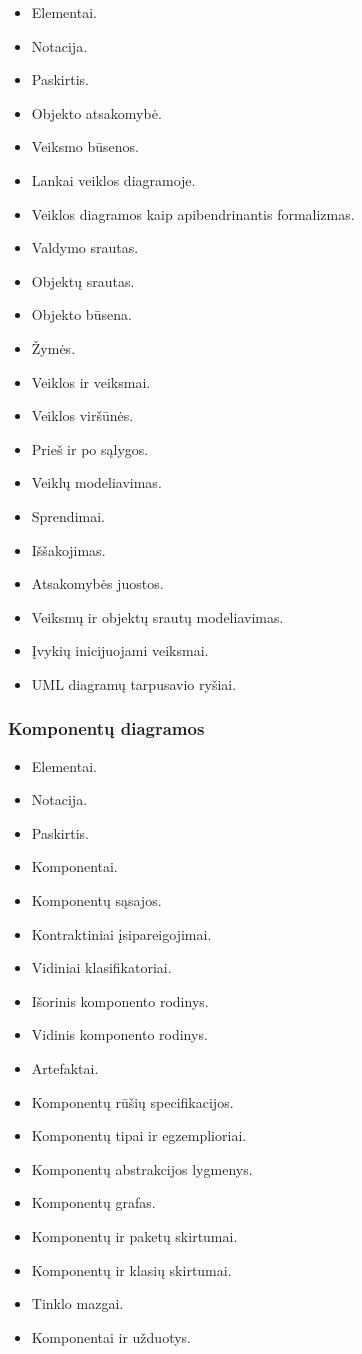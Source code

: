 \begin{itemize}
  \item Elementai.
  \item Notacija.
  \item Paskirtis.
  \item Objekto atsakomybė.
  \item Veiksmo būsenos.
  \item Lankai veiklos diagramoje.
  \item Veiklos diagramos kaip apibendrinantis formalizmas.
  \item Valdymo srautas.
  \item Objektų srautas.
  \item Objekto būsena.
  \item Žymės.
  \item Veiklos ir veiksmai.
  \item Veiklos viršūnės.
  \item Prieš ir po sąlygos.
  \item Veiklų modeliavimas.
  \item Sprendimai.
  \item Iššakojimas.
  \item Atsakomybės juostos.
  \item Veiksmų ir objektų srautų modeliavimas.
  \item Įvykių inicijuojami veiksmai.
  \item UML diagramų tarpusavio ryšiai.
\end{itemize}

\subsubsection{Komponentų diagramos}

\begin{itemize}
  \item Elementai.
  \item Notacija.
  \item Paskirtis.
  \item Komponentai.
  \item Komponentų sąsajos.
  \item Kontraktiniai įsipareigojimai.
  \item Vidiniai klasifikatoriai.
  \item Išorinis komponento rodinys.
  \item Vidinis komponento rodinys.
  \item Artefaktai.
  \item Komponentų rūšių specifikacijos.
  \item Komponentų tipai ir egzemplioriai.
  \item Komponentų abstrakcijos lygmenys.
  \item Komponentų grafas.
  \item Komponentų ir paketų skirtumai.
  \item Komponentų ir klasių skirtumai.
  \item Tinklo mazgai.
  \item Komponentai ir užduotys.
\end{itemize}

